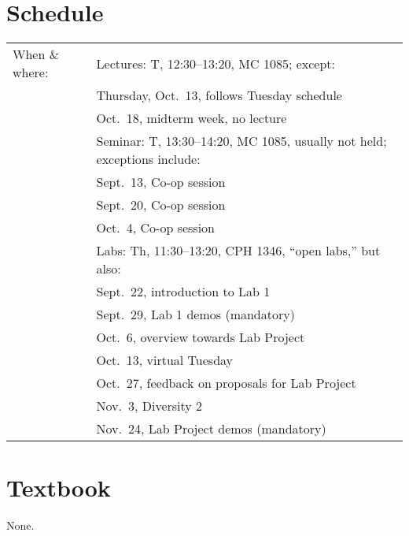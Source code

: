 \documentclass[11pt,onecolumn]{article}
\begin{document}
\section*{Schedule}
\begin{tabular}{ @{\hspace{0.25in}}l l }
    When \& where: & Lectures: T, 12:30--13:20, MC 1085; except: \\
      & \hspace*{0.5in} Thursday, Oct.~13, follows Tuesday schedule\\
      & \hspace*{0.5in} Oct.~18, midterm week, no lecture\\[0.5em]
      & Seminar: T, 13:30--14:20, MC 1085, usually not held; exceptions include:\\
      & \hspace*{0.5in} Sept.~13, Co-op session\\
      & \hspace*{0.5in} Sept.~20, Co-op session\\
      & \hspace*{0.5in} Oct.~4, Co-op session \\[0.5em]
      & Labs: Th, 11:30--13:20, CPH 1346, ``open labs,'' but also: \\
      & \hspace*{0.5in} Sept.~22, introduction to Lab 1\\
      & \hspace*{0.5in} Sept.~29, Lab 1 demos (mandatory)\\
      & \hspace*{0.5in} Oct.~6, overview towards Lab Project\\
      & \hspace*{0.5in} Oct.~13, virtual Tuesday\\
      & \hspace*{0.5in} Oct.~27, feedback on proposals for Lab Project\\
      & \hspace*{0.5in} Nov.~3, Diversity 2\\
      & \hspace*{0.5in} Nov.~24, Lab Project demos (mandatory)\\
\end{tabular}

\section*{Textbook}
None.
\end{document}

